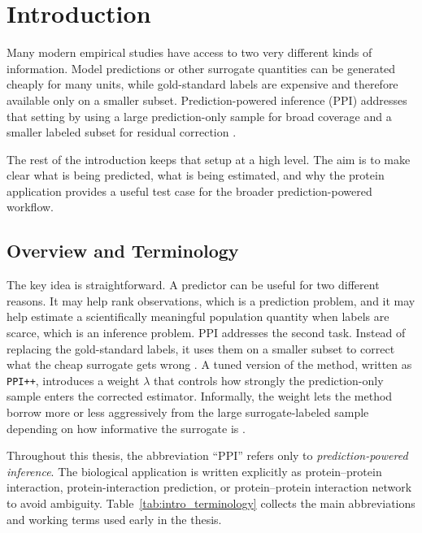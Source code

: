 \chapter{Introduction} \label{chap:introduction}

Many modern empirical studies have access to two very different kinds of information. Model predictions or other surrogate quantities can be generated cheaply for many units, while gold-standard labels are expensive and therefore available only on a smaller subset. Prediction-powered inference (PPI) addresses that setting by using a large prediction-only sample for broad coverage and a smaller labeled subset for residual correction \parencite{ppi_framework}.

The rest of the introduction keeps that setup at a high level. The aim is to make clear what is being predicted, what is being estimated, and why the protein application provides a useful test case for the broader prediction-powered workflow.

\section{Overview and Terminology}

The key idea is straightforward. A predictor can be useful for two different reasons. It may help rank observations, which is a prediction problem, and it may help estimate a scientifically meaningful population quantity when labels are scarce, which is an inference problem. PPI addresses the second task. Instead of replacing the gold-standard labels, it uses them on a smaller subset to correct what the cheap surrogate gets wrong \parencite{ppi_framework}. A tuned version of the method, written as \texttt{PPI++}, introduces a weight $\lambda$ that controls how strongly the prediction-only sample enters the corrected estimator. Informally, the weight lets the method borrow more or less aggressively from the large surrogate-labeled sample depending on how informative the surrogate is \parencite{ppi_pp}.

Throughout this thesis, the abbreviation ``PPI'' refers only to \emph{prediction-powered inference}. The biological application is written explicitly as protein--protein interaction, protein-interaction prediction, or protein--protein interaction network to avoid ambiguity. Table~\ref{tab:intro_terminology} collects the main abbreviations and working terms used early in the thesis.


